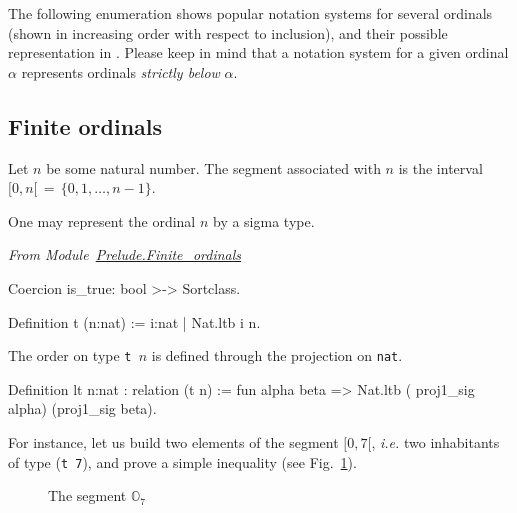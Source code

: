 The following enumeration  shows  popular notation systems for several ordinals (shown in increasing order with respect to inclusion), and their possible representation in \coq{}.
Please keep in mind that a notation system for a given ordinal $\alpha$ represents 
ordinals \emph{strictly below} $\alpha$.

\subsection{Finite ordinals}
Let $n$ be some natural number. The segment associated with $n$ is the interval 
$[0,n[\,=\,\{0,1,\dots,n-1\}$. 

One may represent the ordinal $n$ by a sigma type.


\vspace{4pt}
\noindent\emph{From Module~\href{../src/html/hydras.Prelude.Finite_ordinals.html}{Prelude.Finite\_ordinals}}

\label{def: Finite-ord-type}
\begin{Coqsrc}
Coercion is_true: bool >-> Sortclass.

Definition t (n:nat) := {i:nat | Nat.ltb i  n}.
\end{Coqsrc}

The order on type \texttt{t $n$} is defined through the projection on \texttt{nat}.


\begin{Coqsrc}
Definition lt {n:nat} : relation (t n) :=
  fun alpha beta => Nat.ltb ( proj1_sig alpha) (proj1_sig beta).
\end{Coqsrc}

For instance, let us build two elements of the segment $[0, 7[$, \emph{i.e.} two
inhabitants of   type (\texttt{t 7}), and prove a simple  inequality (see Fig.~\ref{fig:O7}).

\begin{figure}[h]
\centering
{}

\caption{The segment $\mathbb{O}_7$\label{fig:O7}}
\end{figure}
  
